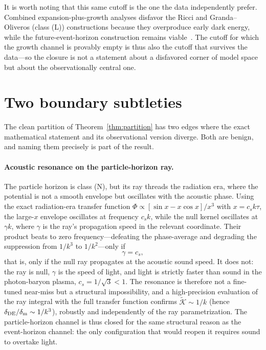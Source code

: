 \documentclass[twocolumn,10pt]{article}
\newcommand{\dDE}{\delta_{\rm DE}}
\newcommand{\dm}{\delta_{\rm m}}
\begin{document}
It is worth noting that this same cutoff is the one the data independently
prefer. Combined expansion-plus-growth analyses disfavor the Ricci and
Granda--Oliveros (class (L)) constructions because they overproduce early dark
energy, while the future-event-horizon construction remains
viable~\cite{Akhlaghi2018}. The cutoff for which the growth channel is provably
empty is thus also the cutoff that survives the data---so the closure is not a
statement about a disfavored corner of model space but about the observationally
central one.

\section{Two boundary subtleties}
\label{sec:boundaries}

The clean partition of Theorem~\ref{thm:partition} has two edges where the exact
mathematical statement and its observational version diverge. Both are benign,
and naming them precisely is part of the result.

\paragraph{Acoustic resonance on the particle-horizon ray.}
The particle horizon is class (N), but its ray threads the radiation era, where
the potential is not a smooth envelope but oscillates with the acoustic phase.
Using the exact radiation-era transfer function
$\Phi\propto[\sin x-x\cos x]/x^3$ with $x=c_s k\tau$, the large-$x$ envelope
oscillates at frequency $c_s k$, while the null kernel oscillates at $\gamma k$,
where $\gamma$ is the ray's propagation speed in the relevant coordinate. Their
product beats to zero frequency---defeating the phase-average and degrading the
suppression from $1/k^3$ to $1/k^2$---only if
\begin{equation}
\gamma=c_s,
\end{equation}
that is, only if the null ray propagates at the acoustic sound speed. It does
not: the ray is null, $\gamma$ is the speed of light, and light is strictly
faster than sound in the photon-baryon plasma, $c_s=1/\sqrt3<1$. The
resonance is therefore not a fine-tuned near-miss but a structural
impossibility, and a high-precision evaluation of the ray integral with the full
transfer function confirms $\widetilde{\mathcal K}\sim1/k$ (hence
$\dDE/\dm\sim1/k^3$), robustly and independently of the ray parametrization.
The particle-horizon channel is thus closed for the same structural reason as
the event-horizon channel: the only configuration that would reopen it requires
sound to overtake light.
\end{document}
